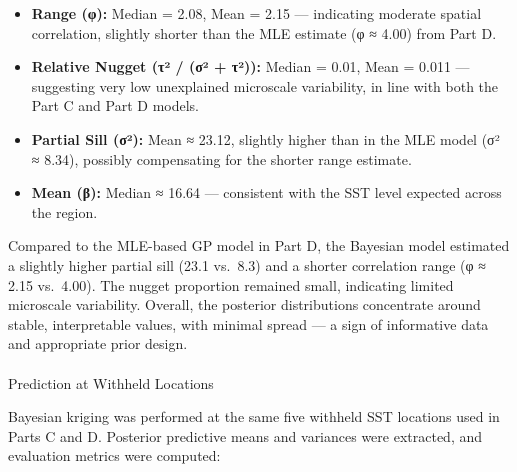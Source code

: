 \documentclass[
  11pt,
]{article}
\makeatletter
\let\oldparagraph\paragraph
\renewcommand{\paragraph}{
    \@ifstar
      \xxxParagraphStar
      \xxxParagraphNoStar
  }
\newcommand{\xxxParagraphStar}[1]{\oldparagraph*{#1}\mbox{}}
\newcommand{\xxxParagraphNoStar}[1]{\oldparagraph{#1}\mbox{}}
\providecommand{\tightlist}{%
  \setlength{\itemsep}{0pt}\setlength{\parskip}{0pt}}\usepackage{longtable,booktabs,array}
\makeatother
\begin{document}
\begin{itemize}
\tightlist
\item
  \textbf{Range (φ):} Median = 2.08, Mean = 2.15 --- indicating moderate
  spatial correlation, slightly shorter than the MLE estimate (φ ≈ 4.00)
  from Part D.
\item
  \textbf{Relative Nugget (τ² / (σ² + τ²)):} Median = 0.01, Mean = 0.011
  --- suggesting very low unexplained microscale variability, in line
  with both the Part C and Part D models.
\item
  \textbf{Partial Sill (σ²):} Mean ≈ 23.12, slightly higher than in the
  MLE model (σ² ≈ 8.34), possibly compensating for the shorter range
  estimate.
\item
  \textbf{Mean (β):} Median ≈ 16.64 --- consistent with the SST level
  expected across the region.
\end{itemize}

Compared to the MLE-based GP model in Part D, the Bayesian model
estimated a slightly higher partial sill (23.1 vs.~8.3) and a shorter
correlation range (φ ≈ 2.15 vs.~4.00). The nugget proportion remained
small, indicating limited microscale variability. Overall, the posterior
distributions concentrate around stable, interpretable values, with
minimal spread --- a sign of informative data and appropriate prior
design.

\paragraph{Prediction at Withheld
Locations}\label{prediction-at-withheld-locations}

Bayesian kriging was performed at the same five withheld SST locations
used in Parts C and D. Posterior predictive means and variances were
extracted, and evaluation metrics were computed:
\end{document}
